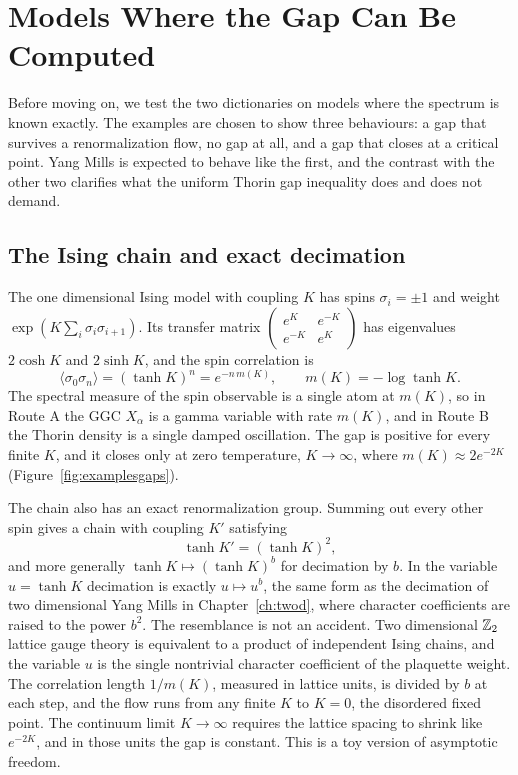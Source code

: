 \section{Models Where the Gap Can Be Computed}\label{ch:examples}

Before moving on, we test the two dictionaries on models where the spectrum is known exactly. The examples are chosen to show three behaviours: a gap that survives a renormalization flow, no gap at all, and a gap that closes at a critical point. Yang Mills is expected to behave like the first, and the contrast with the other two clarifies what the uniform Thorin gap inequality does and does not demand.

\subsection{The Ising chain and exact decimation}

The one dimensional Ising model with coupling $K$ has spins $\sigma_i=\pm1$ and weight $\exp(K\sum_i\sigma_i\sigma_{i+1})$. Its transfer matrix $\begin{pmatrix}e^K&e^{-K}\\ e^{-K}&e^K\end{pmatrix}$ has eigenvalues $2\cosh K$ and $2\sinh K$, and the spin correlation is
\[
\langle\sigma_0\sigma_n\rangle=(\tanh K)^n=e^{-n\,m(K)},\qquad m(K)=-\log\tanh K .
\]
The spectral measure of the spin observable is a single atom at $m(K)$, so in Route A the GGC $X_\alpha$ is a gamma variable with rate $m(K)$, and in Route B the Thorin density is a single damped oscillation. The gap is positive for every finite $K$, and it closes only at zero temperature, $K\to\infty$, where $m(K)\approx2e^{-2K}$ (Figure~\ref{fig:examplesgaps}).

The chain also has an exact renormalization group. Summing out every other spin gives a chain with coupling $K'$ satisfying
\[
\tanh K'=(\tanh K)^2,
\]
and more generally $\tanh K\mapsto(\tanh K)^b$ for decimation by $b$. In the variable $u=\tanh K$ decimation is exactly $u\mapsto u^b$, the same form as the decimation of two dimensional Yang Mills in Chapter~\ref{ch:twod}, where character coefficients are raised to the power $b^2$. The resemblance is not an accident. Two dimensional $\mathbb{Z}_2$ lattice gauge theory is equivalent to a product of independent Ising chains, and the variable $u$ is the single nontrivial character coefficient of the plaquette weight. The correlation length $1/m(K)$, measured in lattice units, is divided by $b$ at each step, and the flow runs from any finite $K$ to $K=0$, the disordered fixed point. The continuum limit $K\to\infty$ requires the lattice spacing to shrink like $e^{-2K}$, and in those units the gap is constant. This is a toy version of asymptotic freedom.

